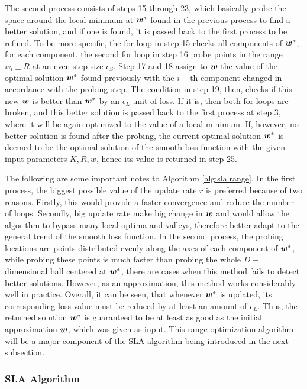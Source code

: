 The second process consists of steps 15 through 23, which basically probe the space around the local minimum at $\boldsymbol{w}^*$ found in the previous process to find a better solution, and if one is found, it is passed back to the first process to be refined. To be more specific, the for loop in step 15 checks all components of $\boldsymbol{w}^*$, for each component, the second for loop in step 16 probe points in the range $w_i \pm R$ at an even step size $\epsilon_S$. Step 17 and 18 assign to $\boldsymbol{w}$ the value of the optimal solution $\boldsymbol{w}^*$ found previously with the $i-$th component changed in accordance with the probing step. The condition in step 19, then, checks if this new $\boldsymbol{w}$ is better than $\boldsymbol{w}^*$ by an $\epsilon_L$ unit of loss. If it is, then both for loops are broken, and this better solution is passed back to the first process at step 3, where it will be again optimized to the value of a local minimum. If, however, no better solution is found after the probing, the current optimal solution $\boldsymbol{w}^*$ is deemed to be the optimal solution of the smooth loss function with the given input parameters $K,R, w$, hence its value is returned in step 25.

The following are some important notes to Algorithm \ref{alg:sla.range}. In the first process, the biggest possible value of the update rate $r$ is preferred because of two reasons. Firstly, this would provide a faster convergence and reduce the number of loops. Secondly, big update rate make big change in $\boldsymbol{w}$ and would allow the algorithm to bypass many local optima and valleys, therefore better adapt to the general trend of the smooth loss function. In the second process, the probing locations are points distributed evenly along the axes of each component of $\boldsymbol{w}^*$, while probing these points is much faster than probing the whole $D-$dimensional ball centered at $\boldsymbol{w}^*$, there are cases when this method fails to detect better solutions. However, as an approximation, this method works considerably well in practice. Overall, it can be seen, that whenever $\boldsymbol{w}^*$ is updated, its corresponding loss value must be reduced by at least an amount of $\epsilon_L$. Thus, the returned solution $\boldsymbol{w}^*$ is guaranteed to be at least as good as the initial approximation $\boldsymbol{w}$, which was given as input. This range optimization algorithm will be a major component of the SLA algorithm being introduced in the next subsection. 


\subsubsection{SLA Algorithm}
\label{ssec:sla.algorithm} 

